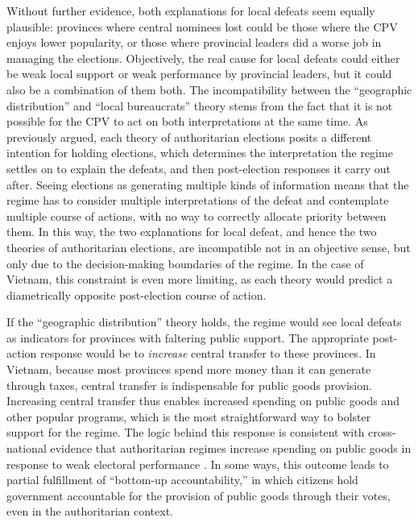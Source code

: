 \documentclass[12pt]{article}\usepackage[]{graphicx}\usepackage[]{color}
\newcommand{\1}{\mathbbm{1}}
\begin{document}
Without further evidence, both explanations for local defeats seem equally plausible: provinces where central nominees lost could be those where the CPV enjoys lower popularity, or those where provincial leaders did a worse job in managing the elections. Objectively, the real cause for local defeats could either be weak local support or weak performance by provincial leaders, but it could also be a combination of them both. The incompatibility between the ``geographic distribution'' and ``local bureaucrats'' theory stems from the fact that it is not possible for the CPV to act on both interpretations at the same time. As previously argued, each theory of authoritarian elections posits a different intention for holding elections, which determines the interpretation the regime settles on to explain the defeats, and then post-election responses it carry out after. Seeing elections as generating multiple kinds of information means that the regime has to consider multiple interpretations of the defeat and contemplate multiple course of actions, with no way to correctly allocate priority between them.  In this way, the two explanations for local defeat, and hence the two theories of authoritarian elections, are incompatible not in an objective sense, but only due to the decision-making boundaries of the regime. In the case of Vietnam, this constraint is even more limiting, as each theory would predict a diametrically opposite post-election course of action.

If the ``geographic distribution'' theory holds, the regime would see local defeats as indicators for provinces with faltering public support. The appropriate post-action response would be to \textit{increase} central transfer to these provinces. In Vietnam, because most provinces spend more money than it can generate through taxes, central transfer is indispensable for public goods provision. Increasing central transfer thus enables increased spending on public goods and other popular programs, which is the most straightforward way to bolster support for the regime. The logic behind this response is consistent with cross-national evidence that authoritarian regimes increase spending on public goods in response to weak electoral performance \citep{Miller2015}. In some ways, this outcome leads to partial fulfillment of ``bottom-up accountability,'' in which citizens hold government accountable for the provision of public goods through their votes, even in the authoritarian context.
\end{document}
